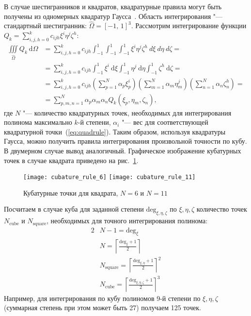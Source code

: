 В случае шестигранников и квадратов, квадратурные правила могут быть получены из одномерных квадратур Гаусса~\cite{Tesini:2008:en}. Область интегрирования "--- стандартный шестигранник: \(\hat\Omega = [-1,\, 1]^3\). Рассмотрим интегрирование функции \(Q_k = \sum_{i, j, h = 0}^k c_{ijh}\xi^i\eta^j\zeta^h\):
\[
\newcommand{\cubature}[3]{\sum_{#1=1}^{N} \alpha_#1 {#2}^#3_#1}
\begin{aligned}
\iiint\limits_{\hat\Omega} Q_k\: \mathrm d\Omega &=  \sum_{i, j, h = 0}^k c_{ijh} \int_{-1}^{1} \int_{-1}^{1} \int_{-1}^{1} \xi^i \eta^j \zeta^h \:d\xi\:d\eta\:d\zeta = \\
&=	\sum_{i, j, h = 0}^k c_{ijh} \int_{-1}^{1} \xi^i\: \mathrm d\xi \int_{-1}^{1} \eta^j\: \mathrm d\eta \int_{-1}^{1} \zeta^h\: \mathrm d\zeta = \\
&= \sum_{i, j, h = 0}^k c_{ijh} (\cubature{p}{\xi}{i})(\cubature{m}{\eta}{j})(\cubature{n}{\zeta}{h}) = \\
&= \sum_{p, m, n = 1}^N \alpha_p\alpha_m\alpha_n Q_k(\xi_p, \eta_m, \zeta_n),
\end{aligned}
\]
где \(N\) "--- количество квадратурных точек, необходимых для интегрирования полинома максимально \(k\)-й степени, \(\alpha_i\) "--- вес для соответствующей квадратурной точки~(\ref{eq:quadrule}). Таким образом, используя квадратуры Гаусса, можно получить правила интегрирования произвольной точности по кубу. В двумерном случае вывод аналогичный. Графическое изображение кубатурных точек в случае квадрата приведено на рис.~\ref{pic:cubature_rect}.

\begin{figure}[h]
	\centering
	\texttt{[image: cubature\_rule\_6]}
	\texttt{[image: cubature\_rule\_11]}
	\caption{ Кубатурные точки для квадрата, \(N = 6\) и \(N = 11\)}
	\label{pic:cubature_rect}
\end{figure}

Посчитаем в случае куба для заданной степени \(\text{deg}_{\xi, \eta, \zeta}\) по \(\xi, \eta, \zeta\) количество точек \(N_{\text{cube}}\) и \(N_{\text{square}}\), необходимых для точного интегрирования полинома:
\[
\begin{aligned}
2&N-1 = \text{deg}_\xi\\
&N = \left\lceil \frac{\text{deg}_\xi + 1}{2} \right\rceil \\
&N_{\text{square}} = \left\lceil \frac{\text{deg}_{\xi, \eta} + 1}{2} \right\rceil^2 \\
&N_{\text{cube}} = \left\lceil \frac{\text{deg}_{\xi, \eta, \zeta} + 1}{2} \right\rceil^3
\end{aligned}
\]
Например, для интегрирования по кубу полиномов 9-й степени по \(\xi, \eta, \zeta\) (суммарная степень при этом может быть 27) получаем 125 точек.

